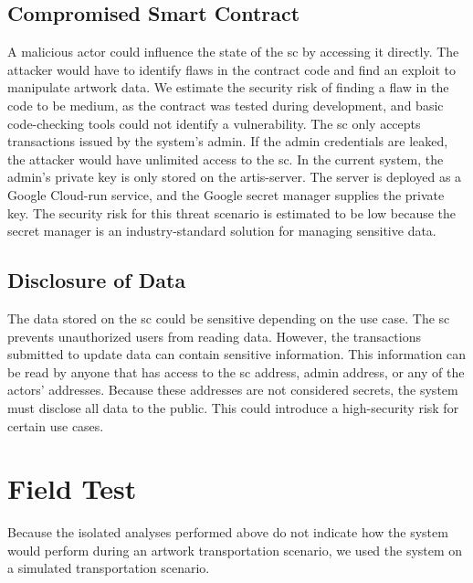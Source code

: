 \subsection{Compromised Smart Contract}
A malicious actor could influence the state of the \gls{sc} by accessing it directly. The attacker would have to identify flaws in the contract code and find an exploit to manipulate artwork data. We estimate the security risk of finding a flaw in the code to be medium, as the contract was tested during development, and basic code-checking tools could not identify a vulnerability. The \gls{sc} only accepts transactions issued by the system's admin. If the admin credentials are leaked, the attacker would have unlimited access to the \gls{sc}. In the current system, the admin's private key is only stored on the artis-server. The server is deployed as a Google Cloud-run service, and the Google secret manager supplies the private key. The security risk for this threat scenario is estimated to be low because the secret manager is an industry-standard solution for managing sensitive data.

\subsection{Disclosure of Data}
The data stored on the \gls{sc} could be sensitive depending on the use case. The \gls{sc} prevents unauthorized users from reading data. However, the transactions submitted to update data can contain sensitive information. This information can be read by anyone that has access to the \gls{sc} address, admin address, or any of the actors' addresses. Because these addresses are not considered secrets, the system must disclose all data to the public. This could introduce a high-security risk for certain use cases.

\section{Field Test}
\label{sec:field_test}
Because the isolated analyses performed above do not indicate how the system would perform during an artwork transportation scenario, we used the system on a simulated transportation scenario.


